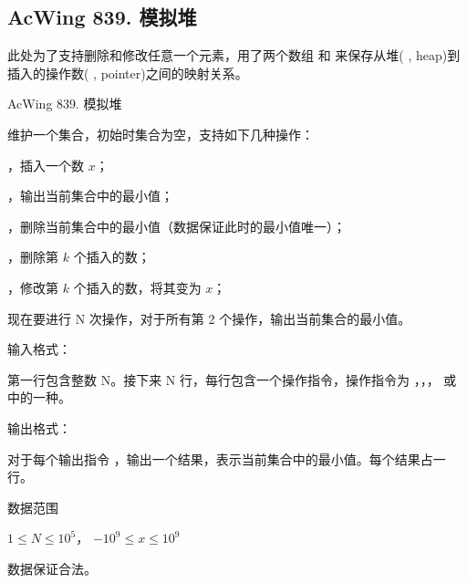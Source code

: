 \subsection{AcWing 839. 模拟堆}

此处为了支持删除和修改任意一个元素，用了两个数组  和  来保存从堆( , heap)到插入的操作数( , pointer)之间的映射关系。

\begin{titledbox}{AcWing 839. 模拟堆}

    维护一个集合，初始时集合为空，支持如下几种操作：

    \begin{myenum}
        \item {}，插入一个数 $x$；
        \item {}，输出当前集合中的最小值；
        \item {}，删除当前集合中的最小值（数据保证此时的最小值唯一）；
        \item {}，删除第 $k$ 个插入的数；
        \item {}，修改第 $k$ 个插入的数，将其变为 $x$；
    \end{myenum}

    现在要进行 N 次操作，对于所有第 2 个操作，输出当前集合的最小值。

    输入格式：

    第一行包含整数 N。接下来 N 行，每行包含一个操作指令，操作指令为 ，，， 或  中的一种。

    输出格式：

    对于每个输出指令 ，输出一个结果，表示当前集合中的最小值。每个结果占一行。

    数据范围

    $1 \le N \le 10^5$， $−10^9 \le x \le 10^9$

    数据保证合法。

    \begin{inputblock}
         \\
         \\
         \\
         \\
         \\
         \\
         \\
         \\
    \end{inputblock}
    \begin{outputblock}
         \\
    \end{outputblock}
\end{titledbox}

